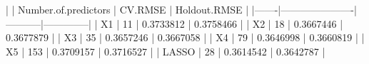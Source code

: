 |       | Number.of.predictors |  CV.RMSE  | Holdout.RMSE | |-------|----------------------|-----------|--------------| |  X1   |          11          | 0.3733812 |  0.3758466   | |  X2   |          18          | 0.3667446 |  0.3677879   | |  X3   |          35          | 0.3657246 |  0.3667058   | |  X4   |          79          | 0.3646998 |  0.3660819   | |  X5   |         153          | 0.3709157 |  0.3716527   | | LASSO |          28          | 0.3614542 |  0.3642787   |